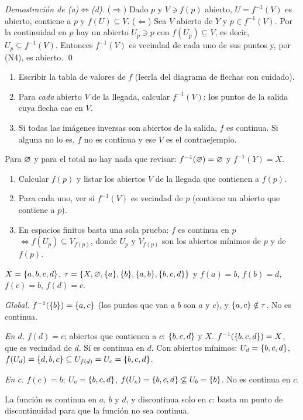 \emph{Demostración de (a)$\iff$(d).} ($\Rightarrow$) Dado $p$ y $V\ni f(p)$ abierto, $U=f^{-1}(V)$ es abierto, contiene
a $p$ y $f(U)\subseteq V$. ($\Leftarrow$) Sea $V$ abierto de $Y$ y $p\in f^{-1}(V)$. Por la continuidad en $p$ hay un
abierto $U_p\ni p$ con $f(U_p)\subseteq V$, es decir, $U_p\subseteq f^{-1}(V)$. Entonces $f^{-1}(V)$ es vecindad de cada
uno de sus puntos y, por (N4), es abierto. \qed

\begin{metodo}
\begin{enumerate}[leftmargin=1.6em]
\item Escribir la tabla de valores de $f$ (leerla del diagrama de flechas con cuidado).
\item Para \emph{cada} abierto $V$ de la llegada, calcular $f^{-1}(V)$: los puntos de la salida cuya flecha cae en $V$.
\item Si todas las imágenes inversas son abiertos de la salida, $f$ es continua. Si alguna no lo es, $f$ no es
continua y ese $V$ es el contraejemplo.
\end{enumerate}
Para $\varnothing$ y para el total no hay nada que revisar: $f^{-1}(\varnothing)=\varnothing$ y $f^{-1}(Y)=X$.
\end{metodo}
\begin{metodo}
\begin{enumerate}[leftmargin=1.6em]
\item Calcular $f(p)$ y listar los abiertos $V$ de la llegada que contienen a $f(p)$.
\item Para cada uno, ver si $f^{-1}(V)$ es vecindad de $p$ (contiene un abierto que contiene a $p$).
\item En espacios finitos basta una sola prueba: $f$ es continua en $p$ $\iff f(U_p)\subseteq V_{f(p)}$, donde $U_p$ y
$V_{f(p)}$ son los abiertos mínimos de $p$ y de $f(p)$.
\end{enumerate}
\end{metodo}

\begin{ejemplo}
$X=\{a,b,c,d\}$, $\tau=\{X,\varnothing,\{a\},\{b\},\{a,b\},\{b,c,d\}\}$ y $f(a)=b$, $f(b)=d$, $f(c)=b$, $f(d)=c$.

\emph{Global.} $f^{-1}(\{b\})=\{a,c\}$ (los puntos que van a $b$ son $a$ y $c$), y $\{a,c\}\notin\tau$. No es continua.

\emph{En $d$.} $f(d)=c$; abiertos que contienen a $c$: $\{b,c,d\}$ y $X$. $f^{-1}(\{b,c,d\})=X$, que es vecindad de
$d$. Sí es continua en $d$. Con abiertos mínimos: $U_d=\{b,c,d\}$, $f(U_d)=\{d,b,c\}\subseteq U_{f(d)}=U_c=\{b,c,d\}$.

\emph{En $c$.} $f(c)=b$; $U_c=\{b,c,d\}$, $f(U_c)=\{b,c,d\}\not\subseteq U_b=\{b\}$. No es continua en $c$.

La función es continua en $a$, $b$ y $d$, y discontinua solo en $c$: basta un punto de discontinuidad para que la
función no sea continua.
\end{ejemplo}

